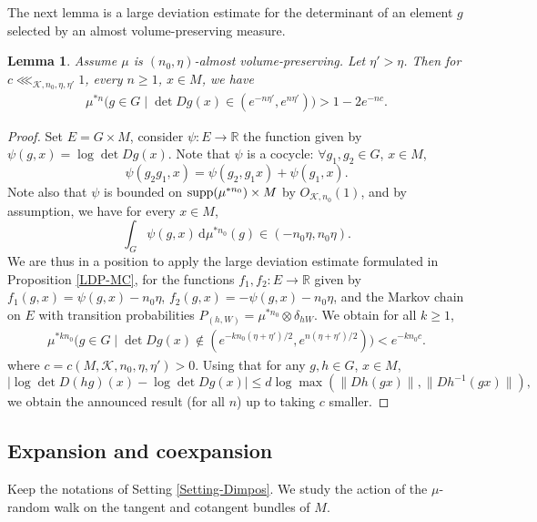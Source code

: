 \documentclass[11pt, leqno, fleqn]{amsart}
\def \R{{\mathbb R}}
\newcommand{\dd}{\,\mathrm{d}}
\newcommand{\cK}{{\mathcal K}}
\newcommand{\aryst}{\begin{eqnarray*}}
\newcommand{\earyst}{\end{eqnarray*}}
\newtheorem{lemma}[thm]{\bf Lemma}
\theoremstyle{definition}
\theoremstyle{definition}
\def\supp{{\rm supp}}
\begin{document}
The next lemma is a large deviation estimate for the determinant of an element $g$ selected by an almost volume-preserving measure.
\begin{lemma} \label{lem detcloseto1} 
Assume $\mu$ is $(n_{0}, \eta)$-almost volume-preserving. Let $\eta'>\eta$. Then for $c\lll_{\cK, n_{0}, \eta, \eta'}1$, every $n\geq1$, $x\in M$,  we have 
	\aryst
				\mu^{*n} \Big ( g \in G \mid  \det Dg(x) \in ( e^{ -  n \eta'}, e^{ n  \eta'}  ) \Big ) > 1 - 2 e^{- nc}.
				\earyst

\end{lemma}


	\begin{proof}
	Set $E=G\times M$, consider $\psi : E\rightarrow \R$ the function given by $\psi(g,x)=\log \det Dg(x)$. Note that $\psi$ is a cocycle: $\forall g_{1},g_{2}\in G$, $x\in M$, 
	$$ \psi(g_{2}g_{1},x)=\psi(g_{2},g_{1}x)+ \psi(g_{1},x).$$
	Note also that $\psi$ is bounded on $\supp(\mu^{* n_0}) \times M$ by $O_{\cK, n_0}(1)$, and by assumption,  we have for every $x\in M$,
	$$\int_{G} \psi(g,x) \dd \mu^{*n_{0}}(g) \in (-n_{0}\eta, n_{0}\eta).$$ 
	We are thus in a position to apply the large deviation estimate formulated in Proposition \ref{LDP-MC}, for the functions $f_{1}, f_{2}:E\rightarrow \R$ given by $f_{1}(g,x)=\psi(g,x)-n_{0}\eta$, $f_{2}(g,x)=-\psi(g,x)-n_{0}\eta$, and the Markov chain on $E$ with transition probabilities $P_{(h, W)} = \mu^{*n_{0}} \otimes \delta_{hW}$. We obtain for all $k\geq1$, 
		\aryst
				\mu^{*kn_{0}} \Big ( g \in G \mid  \det Dg(x) \notin ( e^{ -  kn_{0} (\eta+\eta')/2}, e^{ n  (\eta+\eta')/2}  ) \Big ) <  e^{- k n_{0}c}.
				\earyst
	where $c=c(M, \cK, n_{0}, \eta, \eta')>0$. Using that 	for any $g,h\in G$, $x\in M$, 
	$$ |\log \det D(hg)(x) -\log \det Dg(x)| \leq d\log \max(\|Dh(gx)\|, \|Dh^{-1}(gx)\|),$$ we obtain the announced result (for all $n$) up to taking $c$ smaller. 		
	\end{proof}
 


 

		 
		 \subsection{Expansion and  coexpansion}
	Keep the notations of Setting  \ref{Setting-Dimpos}.	 
  We study the action of the $\mu$-random walk on the tangent and cotangent bundles of $M$. 
\end{document}
